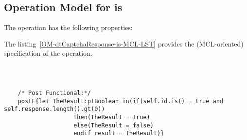 \subsection{Operation Model for is}

\label{OM-is}


The  operation has the following properties:

	\begin{operationmodel}



		


	\end{operationmodel}



	\vspace{1cm}
	The listing~\ref{OM-dtCaptchaResponse-is-MCL-LST} provides the \msrmessir (MCL-oriented) specification of the operation.
	
	\scriptsize
	\vspace{0.5cm}
	\begin{lstlisting}[style=MessirStyle,firstnumber=auto,captionpos=b,caption={\msrmessir (MCL-oriented) specification of the operation \emph{is}.},label=OM-dtCaptchaResponse-is-MCL-LST]

	
	
	/* Post Functional:*/ 
	postF{let TheResult:ptBoolean in(if(self.id.is() = true and self.response.length().gt(0))
					then(TheResult = true)
					else(TheResult = false)
					endif result = TheResult)}
	
	
	\end{lstlisting}
	\normalsize 
	
	
	
	





